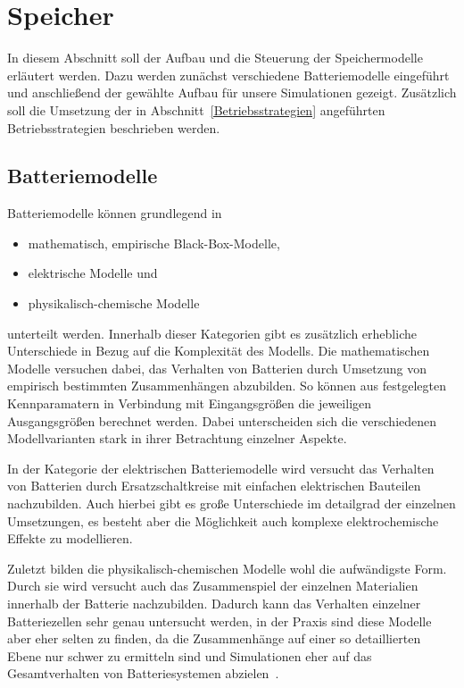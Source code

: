 \section{Speicher}\label{Speicher}
In diesem Abschnitt soll der Aufbau und die Steuerung der Speichermodelle erläutert werden.
Dazu werden zunächst verschiedene Batteriemodelle eingeführt und anschließend der gewählte Aufbau für
unsere Simulationen gezeigt. 
Zusätzlich soll die Umsetzung der in Abschnitt~\ref{Betriebsstrategien} angeführten Betriebsstrategien 
beschrieben werden.

\subsection{Batteriemodelle}\label{Batteriemodelle}
Batteriemodelle können grundlegend in 
\begin{itemize}
    \item mathematisch, empirische Black-Box-Modelle,
    \item elektrische Modelle und
   \item physikalisch-chemische Modelle
\end{itemize}
unterteilt werden. 
Innerhalb dieser Kategorien gibt es zusätzlich erhebliche Unterschiede in Bezug auf die Komplexität des Modells.
Die mathematischen Modelle versuchen dabei, das Verhalten von Batterien durch Umsetzung von empirisch bestimmten
Zusammenhängen abzubilden.
So können aus festgelegten Kennparamatern in Verbindung mit Eingangsgrößen die jeweiligen Ausgangsgrößen berechnet werden.
Dabei unterscheiden sich die verschiedenen Modellvarianten stark in ihrer Betrachtung einzelner Aspekte.

In der Kategorie der elektrischen Batteriemodelle wird versucht das Verhalten von Batterien durch Ersatzschaltkreise
mit einfachen elektrischen Bauteilen nachzubilden.
Auch hierbei gibt es große Unterschiede im detailgrad der einzelnen Umsetzungen, es besteht aber die Möglichkeit
auch komplexe elektrochemische Effekte zu modellieren.

Zuletzt bilden die physikalisch-chemischen Modelle wohl die aufwändigste Form.
Durch sie wird versucht auch das Zusammenspiel der einzelnen Materialien innerhalb der Batterie nachzubilden.
Dadurch kann das Verhalten einzelner Batteriezellen sehr genau untersucht werden, in der Praxis sind diese
Modelle aber eher selten zu finden, da die Zusammenhänge auf einer so detaillierten Ebene nur schwer zu ermitteln sind
und Simulationen eher auf das Gesamtverhalten von Batteriesystemen abzielen~\parencite[]{keil2012aufbau}.

